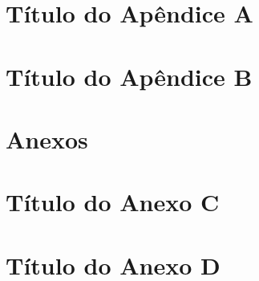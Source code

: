 \documentclass[12pt,a4paper,oneside]{memoir}
\begin{document}
\chapter{Título do Apêndice A} %
\chapter{Título do Apêndice B} %


\chapter*{Anexos}
\chapter{Título do Anexo C} %
\chapter{Título do Anexo D} %
\end{document}
